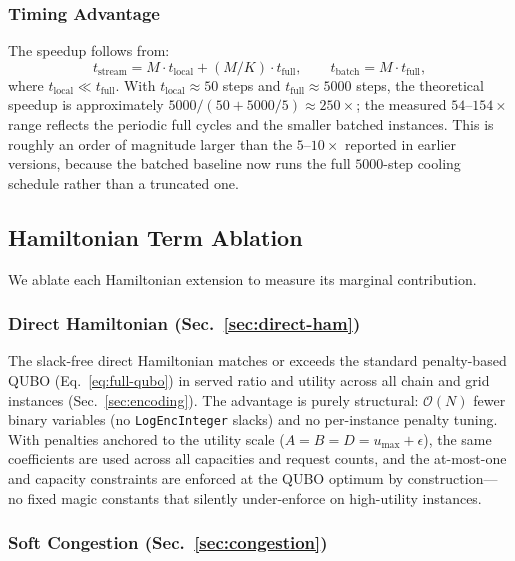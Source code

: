 \documentclass[10pt,a4paper]{article}
\begin{document}
\subsubsection{Timing Advantage}

The speedup follows from:
\begin{equation}
  t_{\text{stream}} = M \cdot t_{\text{local}} + (M/K) \cdot t_{\text{full}},
  \qquad
  t_{\text{batch}} = M \cdot t_{\text{full}},
\end{equation}
where $t_{\text{local}} \ll t_{\text{full}}$.  With $t_{\text{local}}
\approx 50$ steps and $t_{\text{full}} \approx 5000$ steps, the
theoretical speedup is approximately
$5000 / (50 + 5000/5) \approx 250\times$; the measured
$54$--$154\times$ range reflects the periodic full cycles and the
smaller batched instances.  This is roughly an order of
magnitude larger than the $5$--$10\times$ reported in earlier
versions, because the batched baseline now runs the full $5000$-step
cooling schedule rather than a truncated one.

\subsection{Hamiltonian Term Ablation}
\label{sec:ablation}

We ablate each Hamiltonian extension to measure its marginal
contribution.

\subsubsection{Direct Hamiltonian (Sec.~\ref{sec:direct-ham})}

The slack-free direct Hamiltonian matches or exceeds the standard
penalty-based QUBO (Eq.~\eqref{eq:full-qubo}) in served ratio and
utility across all chain and grid instances (Sec.~\ref{sec:encoding}).
The advantage is purely structural: $\mathcal{O}(N)$ fewer binary
variables (no \texttt{LogEncInteger} slacks) and no per-instance
penalty tuning.  With penalties anchored to the utility scale
($A = B = D = u_{\max} + \epsilon$), the same coefficients are used
across all capacities and request counts, and the at-most-one and
capacity constraints are enforced at the QUBO optimum by
construction---no fixed magic constants that silently under-enforce on
high-utility instances.

\subsubsection{Soft Congestion (Sec.~\ref{sec:congestion})}
\end{document}
